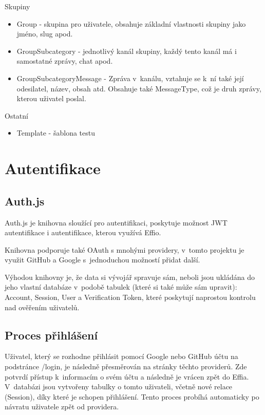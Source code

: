 \documentclass[12pt, a4paper,
openright
]{report}
\begin{document}
Skupiny
\begin{itemize}
	\item Group - skupina pro uživatele, obsahuje základní vlastnosti skupiny jako jméno, slug apod.
	\item GroupSubcategory - jednotlivý kanál skupiny, každý tento kanál má i samostatné zprávy, chat apod.
	\item GroupSubcategoryMessage - Zpráva v~kanálu, vztahuje se k~ní také její odesilatel, název, obsah atd. Obsahuje také MessageType, což je druh zprávy, kterou uživatel poslal.
\end{itemize}
Ostatní
\begin{itemize}
	\item Template - šablona testu
\end{itemize}

\section{Autentifikace}
\subsection{Auth.js}

Auth.js je knihovna sloužící pro autentifikaci, poskytuje možnost JWT autentifikace i   autentifikace, kterou využívá Effio. 

Knihovna podporuje také OAuth s mnohými providery, v~tomto projektu je využit GitHub a Google s~jednoduchou možností přidat další. 

Výhodou knihovny je, že data si vývojář spravuje sám, neboli jsou ukládána do jeho vlastní databáze v~podobě tabulek (které si také může sám upravit): Account, Session, User a Verification Token, které poskytují naprostou kontrolu nad ověřením uživatelů.

\subsection{Proces přihlášení}
Uživatel, který se rozhodne přihlásit pomocí Google nebo GitHub účtu na podstránce /login, je následně přesměrován na stránky těchto providerů. Zde potvrdí přístup k~informacím o svém účtu a následně je vrácen zpět do Effia. V~databázi jsou vytvořeny tabulky o tomto uživateli, včetně nové relace (Session), díky které je schopen přihlášení. Tento proces probíhá automaticky po návratu uživatele zpět od providera.
\end{document}
